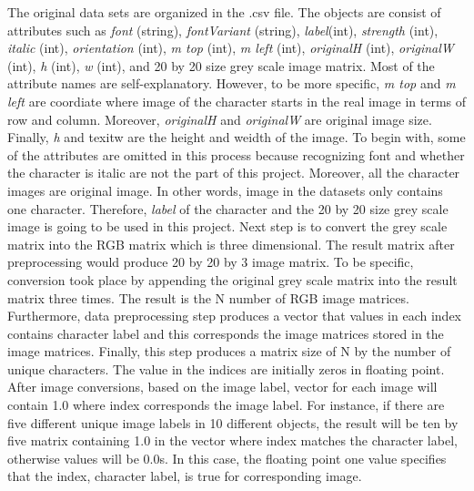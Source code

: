 The original data sets are organized in the .csv file.
The objects are consist of attributes such as \textit{font} (string), \textit{fontVariant} (string), \textit{label}(int),
\textit{strength} (int), \textit{italic} (int), \textit{orientation} (int), \textit{m top} (int), \textit{m left} (int),
\textit{originalH} (int), \textit{originalW} (int), \textit{h} (int), \textit{w} (int), and 20 by 20 size grey scale image matrix.
Most of the attribute names are self-explanatory. However, to be more specific,
\textit{m top} and \textit{m left} are coordiate where image of the character starts in the real image in terms of row and column.
Moreover, \textit{originalH} and \textit{originalW} are original image size. Finally, \textit{h} and texit{w} are the height and weidth of
the image.
\newline
\newline
\indent
To begin with, some of the attributes are omitted in this process because recognizing font and whether the
character is italic are not the part of this project. Moreover, all the character images are original image.
In other words, image in the datasets only contains one character. Therefore, \textit{label} of the character and the
20 by 20 size grey scale image is going to be used in this project.
\newline
\newline
\indent
Next step is to convert the grey scale matrix into the RGB matrix which is three dimensional. The result matrix
after preprocessing would produce 20 by 20 by 3 image matrix. To be specific, conversion took place by appending
the original grey scale matrix into the result matrix three times. The result is the N number of RGB image matrices.
\newline
\newline
\indent
Furthermore, data preprocessing step produces a vector that values in each index contains character label and this
corresponds the image matrices stored in the image matrices. Finally, this step produces a matrix size of N by the number
of unique characters. The value in the indices are initially zeros in floating point. After image conversions, based on
the image label, vector for each image will contain 1.0 where index corresponds the image label. For instance, if there are
five different unique image labels in 10 different objects, the result will be ten by five matrix containing 1.0 in the vector
where index matches the character label, otherwise values will be 0.0s. In this case, the floating point one value specifies that
the index, character label, is true for corresponding image.